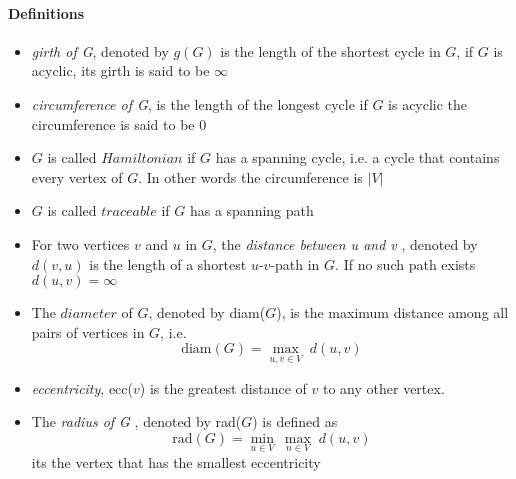 \paragraph{Definitions} 
\begin{itemize}
    \item \textit{girth of G}, denoted by $ g(G) $ is the length of the shortest cycle
    in $ G $, if $ G $ is acyclic, its girth is said to be $ \infty $
    \item \textit{circumference of G}, is the length of the longest cycle
    if $ G $ is acyclic the circumference is said to be $0$
    \item $ G $ is called $ Hamiltonian $ if $ G $ has a spanning cycle, i.e. 
    a cycle that contains every vertex of $ G $. In other words the circumference is 
    $ |V|$
    \item $ G $ is called $ traceable $ if $ G $ has a spanning path
    \item For two vertices $ v $ and $ u $ in $ G $, the 
    \textit{distance between u and v }, denoted by $ d(v,u) $ is the length of 
    a shortest $u$-$v$-path in $ G $. If no such path exists $ d(u,v) = \infty $
    \item The $ diameter $ of $ G $, denoted by diam($G$), is the maximum distance 
    among all pairs of vertices in $ G $, i.e.
    $$ \text{diam}(G) = \underset{u,v \in V}{\max} \; d(u,v)$$
    \item \textit{eccentricity}, ecc($v$) is the greatest distance of $ v $ to any 
    other vertex.
    \item The \textit{radius of G }, denoted by rad($G$) is defined as 
    $$ \text{rad}(G) =  \underset{u \in V}{\min} \: \underset{n \in V}{\max} \;d(u,v) $$
    its the vertex that has the smallest eccentricity 

\end{itemize}